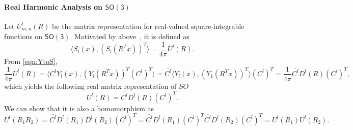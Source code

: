 \documentclass[onecolumn,11pt]{IEEEtran}
\newcommand{\pair}[1]{\ensuremath{\langle #1 \rangle}}
\newcommand{\SO}{\ensuremath{\mathsf{SO(3)}}}
\begin{document}
\paragraph{Real Harmonic Analysis on $\SO$}
Let $U^l_{m,n}(R)$ be the matrix representation for  real-valued square-integrable functions on $\SO$. 
Motivated by above~\cite{BlaFloJMS97}, it is defined as
\[
    \pair{ S_l(x), (S_l(R^Tx))^T } = \frac{1}{4\pi} U^l(R).
\]
From \eqref{eqn:YtoS},
\[
\frac{1}{4\pi} U^l(R) = \pair{ C^l Y_l(x),  (Y_l(R^T x))^T (C^l)^T } 
= \overline{C^l} \pair{ Y_l(x), (Y_1(R^T x))^T} (C^l)^T
= \frac{1}{4\pi} \overline{C^l} D^l(R) (C^l)^T,
\]
which yields the following real matrix representation of $SO$
\begin{equation}
    U^l (R) = \overline{C^l} D^l(R) (C^l)^T.\label{eqn:Ul}
\end{equation}
We can show that it is also a homomorphism as
\[
    U^l( R_1 R_2) = \overline{C^l} D^l(R_1)D^l(R_2)  (C^l)^T
    =\overline{C^l} D^l(R_1) (C^l)^T  \overline{C^l} D^l(R_2)  (C^l)^T
    = U^l(R_1) U^l(R_2).
\]
\end{document}
